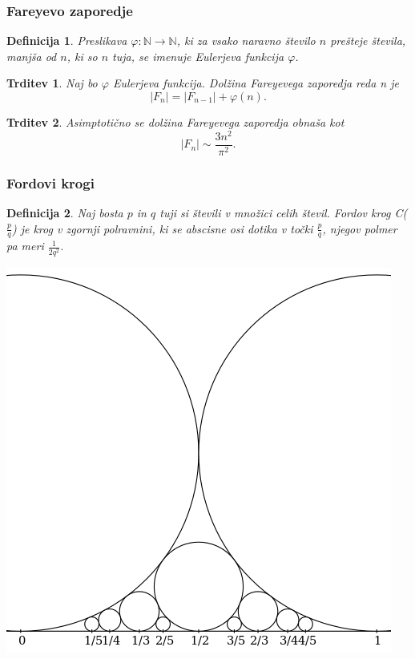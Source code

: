 \documentclass{beamer}
\newtheorem{definicija}{Definicija}
\newtheorem{trditev}{Trditev}
\begin{document}

\begin{frame}
\frametitle{Fareyevo zaporedje}

\begin{definicija}
Preslikava \( \varphi \colon \mathbb{N} \rightarrow \mathbb{N}\), ki za vsako naravno število $n$ prešteje števila, manjša od $n$, ki so $n$ tuja, se imenuje \emph{Eulerjeva funkcija} $\varphi$.
\end{definicija}

\pause
\begin{trditev}
\label{trd:DolzinaZap}
Naj bo $\varphi$ Eulerjeva funkcija. Dolžina Fareyevega zaporedja reda n je
\[  |F_{n}| = |F_{n-1}| + \varphi(n). \]
\end{trditev}

\pause
\begin{trditev}
\label{trd:AsimptotDolzina}
Asimptotično se dolžina Fareyevega zaporedja obnaša kot
\[  |F_{n}|\sim\frac{3n^2}{\pi^2}. \]
\end{trditev}

\end{frame}


\begin{frame}
\frametitle{Fordovi krogi}

\pause
\begin{definicija}
Naj bosta $p$ in $q$ tuji si števili v množici celih števil.
\emph{Fordov krog} C($\frac{p}{q}$) je krog v zgornji polravnini, ki se abscisne osi dotika v točki $\frac{p}{q}$, njegov polmer pa meri $\frac{1}{2q^2}$. 
\end{definicija}

\begin{center}
\includegraphics[scale=0.3]{fordov-krog.png}
\end{center}

\end{frame}
\end{document}
